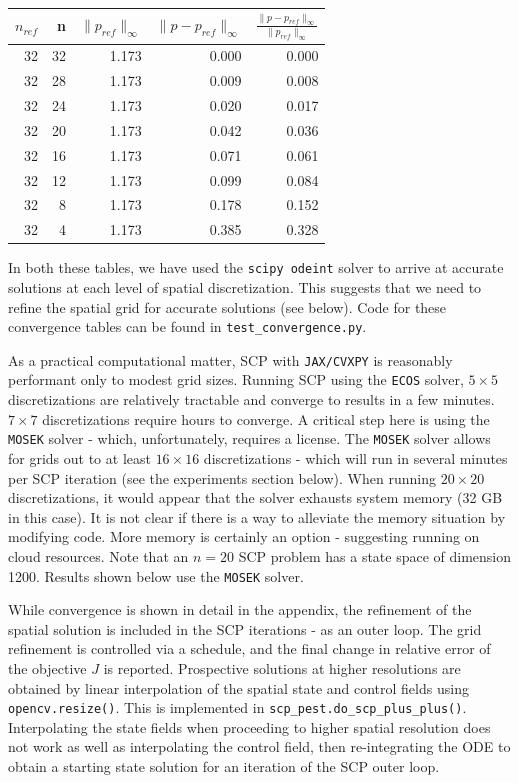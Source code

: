 \documentclass[11pt]{article}
\begin{document}
\begin{center}
\begin{tabular}{rrrrr}
\toprule
$n_{ref}$ & n & $\| p_{ref} \|_{\infty}$ & $\| p-p_{ref} \|_{\infty}$ & $\frac{\| p-p_{ref} \|_{\infty}}{\| p_{ref} \|_{\infty}}$ \\
\midrule
32 & 32 & 1.173 & 0.000 & 0.000 \\
32 & 28 & 1.173 & 0.009 & 0.008 \\
32 & 24 & 1.173 & 0.020 & 0.017 \\
32 & 20 & 1.173 & 0.042 & 0.036 \\
32 & 16 & 1.173 & 0.071 & 0.061 \\
32 & 12 & 1.173 & 0.099 & 0.084 \\
32 & 8 & 1.173 & 0.178 & 0.152 \\
32 & 4 & 1.173 & 0.385 & 0.328 \\
\bottomrule
\end{tabular}
\end{center}

In both these tables, we have used the \texttt{scipy odeint} solver to arrive at accurate solutions at each level of spatial discretization. This suggests that we need to refine the spatial grid for accurate solutions (see below). Code for these convergence tables can be found in \texttt{test\_convergence.py}.

As a practical computational matter, SCP with \texttt{JAX/CVXPY} is reasonably performant only to modest grid sizes. Running SCP using the \texttt{ECOS} solver, $5 \times 5$ discretizations are relatively tractable and converge to results in a few minutes. $7 \times 7$ discretizations require hours to converge. A critical step here is using the \texttt{MOSEK} solver - which, unfortunately, requires a license. The \texttt{MOSEK} solver allows for grids out to at least $16 \times 16$ discretizations - which will run in several minutes per SCP iteration (see the experiments section below). When running $20 \times 20$ discretizations, it would appear that the solver exhausts system memory (32 GB in this case). It is not clear if there is a way to alleviate the memory situation by modifying code. More memory is certainly an option - suggesting running on cloud resources. Note that an $n=20$ SCP problem has a state space of dimension 1200. Results shown below use the \texttt{MOSEK} solver.

While convergence is shown in detail in the appendix, the refinement of the spatial solution is included in the SCP iterations - as an outer loop. The grid refinement is controlled via a schedule, and the final change in relative error of the objective $J$ is reported. Prospective solutions at higher resolutions are obtained by linear interpolation of the spatial state and control fields using \texttt{opencv.resize()}.  This is implemented in \texttt{scp\_pest.do\_scp\_plus\_plus()}. Interpolating the state fields when proceeding to higher spatial resolution does not work as well as interpolating the control field, then re-integrating the ODE to obtain a starting state solution for an iteration of the SCP outer loop.
\end{document}
